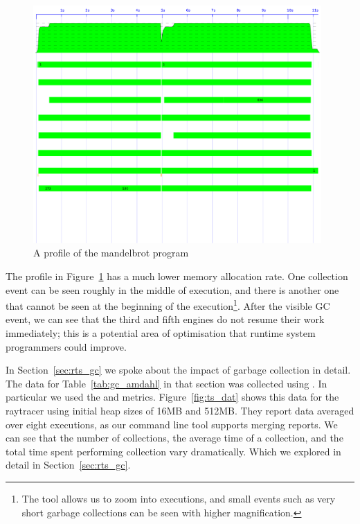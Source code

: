 \begin{figure}
\includegraphics[width=0.98\textwidth]{pics/mandelbrot_eventlog}
\caption{A profile of the mandelbrot program}
\label{fig:ts_mandelbrot}
\end{figure}

The profile in Figure~\ref{fig:ts_mandelbrot} has a much lower memory
allocation rate.
One collection event can be seen roughly in the middle of execution,
and there is another one that cannot be seen at the beginning of the
execution\footnote{
    The \tscope tool allows us to zoom into executions,
    and small events such as very short garbage collections can be seen with
    higher magnification.}.
After the visible GC event,
we can see that the third and fifth engines do not resume their work
immediately;
this is a potential area of optimisation that runtime system programmers
could improve.

In Section~\ref{sec:rts_gc} we spoke about the impact of garbage collection
in detail.
The data for Table~\ref{tab:gc_amdahl} in that section was collected using
\tscope.
In particular we used the  and 
metrics.
Figure~\ref{fig:ts_dat} shows this data for the
raytracer using initial heap sizes of 16MB and 512MB.
They report data averaged over eight executions,
as our command line tool supports merging \tscope reports.
We can see that the number of collections, 
the average time of a collection,
and the total time spent performing collection vary dramatically.
Which we explored in detail in Section~\ref{sec:rts_gc}.

